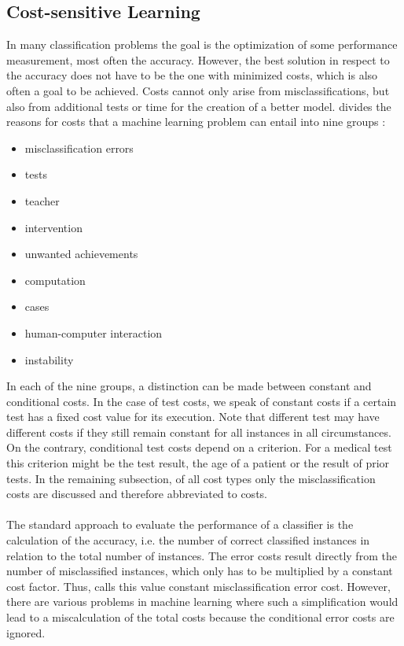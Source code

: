 \documentclass[article,type=msc,colorback,accentcolor=tud7b]{tudthesis}
\begin{document}
  \subsection{Cost-sensitive Learning}
  \label{subsec:cost_sensitive_learning}
    In many classification problems the goal is the optimization of some performance measurement, most often the accuracy. However, the best solution in respect to the accuracy does not have to be the one with minimized costs, which is also often a goal to be achieved. Costs cannot only arise from misclassifications, but also from additional tests or time for the creation of a better model. \citeauthor{Turney2002} divides the reasons for costs that a machine learning problem can entail into nine groups \autocite{Turney2002}:
    \begin{itemize}[noitemsep]
      \item misclassification errors
      \item tests
      \item teacher
      \item intervention
      \item unwanted achievements
      \item computation
      \item cases
      \item human-computer interaction
      \item instability
    \end{itemize}
    In each of the nine groups, a distinction can be made between constant and conditional costs. In the case of test costs, we speak of constant costs if a certain test has a fixed cost value for its execution. Note that different test may have different costs if they still remain constant for all instances in all circumstances. On the contrary, conditional test costs depend on a criterion. For a medical test this criterion might be the test result, the age of a patient or the result of prior tests. In the remaining subsection, of all cost types only the misclassification costs are discussed and therefore abbreviated to costs. \\\\
    The standard approach to evaluate the performance of a classifier is the calculation of the accuracy, i.e. the number of correct classified instances in relation to the total number of instances. The error costs result directly from the number of misclassified instances, which only has to be multiplied by a constant cost factor. Thus, \citeauthor{Turney2002} calls this value constant misclassification error cost. However, there are various problems in machine learning where such a simplification would lead to a miscalculation of the total costs because the conditional error costs are ignored. \\\\
\end{document}
